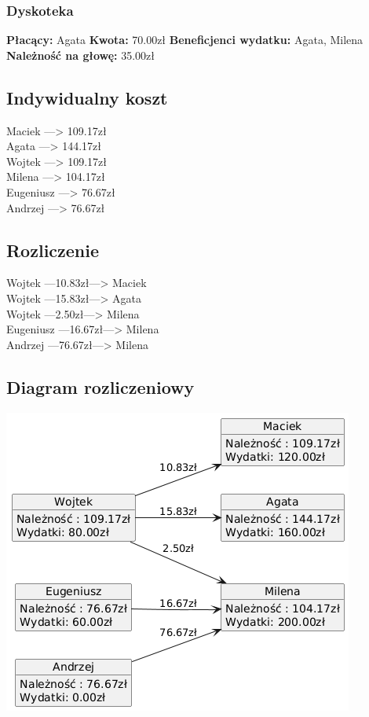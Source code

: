 \documentclass{report}
\begin{document}
\subsubsection*{Dyskoteka}
\textbf{Płacący: } Agata
\textbf{Kwota: } 70.00zł
\textbf{Beneficjenci wydatku: }Agata, Milena  
 \textbf{Należność na głowę: } 35.00zł
\subsection*{Indywidualny koszt}
Maciek ---> 109.17zł\\Agata ---> 144.17zł\\Wojtek ---> 109.17zł\\Milena ---> 104.17zł\\Eugeniusz ---> 76.67zł\\Andrzej ---> 76.67zł\\\subsection*{Rozliczenie}
Wojtek ---10.83zł---> Maciek\\Wojtek ---15.83zł---> Agata\\Wojtek ---2.50zł---> Milena\\Eugeniusz ---16.67zł---> Milena\\Andrzej ---76.67zł---> Milena\\\subsection*{Diagram rozliczeniowy}
\includegraphics[scale=0.4]{out/diagram_rozliczenie.png}\\
\end{document}
